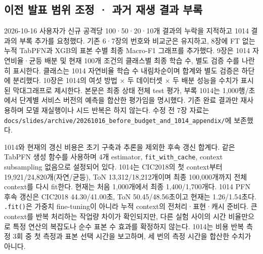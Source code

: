 \subsection{이전 발표 범위 조정 · 과거 재생 결과 부록}
2026-10-16 사용자가 신규 공격당 100·50·20·10개 결과의 누락을 지적하고 1014 결과의 부록 추가를 요청했다. 기존 6·7장의 번호와 비교군은 유지하고, 8장에 FT 없는 누적 TabPFN과 XGB의 표본 수별 최종 Macro-F1 그래프를 추가했다. 9장은 1014 자연비율·균등 배분 및 현재 100개 조건의 클래스별 최종 학습 수, 별도 검증 수를 나란히 표시한다. 클래스는 1014 자연비율 학습 수 내림차순이며 합계와 별도 검증은 하단에 분리했다. 10장은 1014의 여섯 방법 × 두 데이터셋 × 두 배분 성능을 수치가 표시된 막대그래프로 제시한다. 본문은 최종 상태 전체 test 평가, 부록 1014는 1,000행/\allowbreak{}초에서 단계별 서비스 버전의 예측을 합산한 평가임을 명시했다. 기존 완료 결과만 재사용하며 모델 재실행이나 시드 반복은 하지 않는다. 수정 전 7장 자료는 \texttt{docs/\allowbreak{}\allowbreak{}sli\allowbreak{}des/\allowbreak{}\allowbreak{}arch\allowbreak{}ive/\allowbreak{}\allowbreak{}2026\allowbreak{}1016\_\allowbreak{}\allowbreak{}bef\allowbreak{}ore\_\allowbreak{}\allowbreak{}budg\allowbreak{}et\_\allowbreak{}\allowbreak{}and\_\allowbreak{}\allowbreak{}1\allowbreak{}014\_\allowbreak{}\allowbreak{}appe\allowbreak{}ndix/\allowbreak{}\allowbreak{}}에 보존했다.

1014와 현재의 갱신 비용은 초기 구축과 추론을 제외한 후속 갱신 합계다. 같은 TabPFN 생성 함수를 사용하며 4개 estimator, \texttt{fit\_\allowbreak{}\allowbreak{}with\allowbreak{}\_\allowbreak{}\allowbreak{}cache}, context subsampling 없음으로 설정되어 있다. 1014는 CIC2018의 첫 context부터 19,921/\allowbreak{}24,820개(자연/\allowbreak{}균등), ToN 13,312/\allowbreak{}18,212개이며 최종 100,000개까지 전체 context를 다시 fit한다. 현재는 처음 1,000개에서 최종 1,400/\allowbreak{}1,700개다. 1014 PFN 후속 갱신은 CIC2018 44.30/\allowbreak{}41.00초, ToN 50.45/\allowbreak{}48.56초이고 현재는 1.26/\allowbreak{}1.54초다. \texttt{.\allowbreak{}fit()}은 가중치 fine-tuning이 아니라 누적 context의 전처리·표현·캐시 준비다. 큰 context를 반복 처리하는 작업량 차이가 확인되지만, 다른 실험 사이의 시간 비율만으로 특정 연산의 복잡도나 순수 표본 수 효과를 확정하지 않는다. 1014는 비용 반복 측정 3회 중 첫 측정과 표본 선택 시간을 보고하며, 세 번의 측정 시간을 합산한 수치가 아니다.

